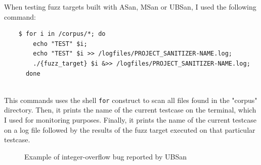 \newpage
When testing fuzz targets built with ASan, MSan or UBSan, I used the following command:
\begin{verbatim}
    $ for i in /corpus/*; do 
        echo "TEST" $i; 
        echo "TEST" $i >> /logfiles/PROJECT_SANITIZER-NAME.log; 
        ./{fuzz_target} $i &>> /logfiles/PROJECT_SANITIZER-NAME.log; 
      done
\end{verbatim}
\ \\
This commands uses the shell \verb|for| construct to scan all files found in the "corpus" directory.
\newline
Then, it prints the name of the current testcase on the terminal, which I used for monitoring purposes.
\newline
Finally, it prints the name of the current testcase on a log file followed by the results of the fuzz target executed on that particular testcase.
\newline
\begin{figure}[h]
\caption{Example of integer-overflow bug reported by UBSan}
\label{fig:ubsan_example}
\end{figure}
\ \\



